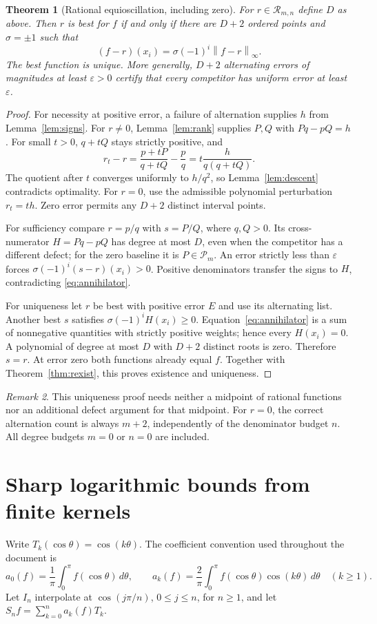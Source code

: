 \documentclass[11pt]{article}
\newcommand{\PP}{\mathcal P}
\newcommand{\norm}[1]{\left\lVert#1\right\rVert}
\newtheorem{theorem}{Theorem}[section]
\theoremstyle{remark}\newtheorem{remark}[theorem]{Remark}
\begin{document}
\begin{theorem}[Rational equioscillation, including zero]\label{thm:rational}
For $r\in\mathcal R_{m,n}$ define $D$ as above. Then $r$ is best for $f$
if and only if there are $D+2$ ordered points and $\sigma=\pm1$ such that
\[
 (f-r)(x_i)=\sigma(-1)^i\norm{f-r}_\infty.
\]
The best function is unique. More generally, $D+2$ alternating errors
of magnitudes at least $\varepsilon>0$ certify that every competitor has
uniform error at least $\varepsilon$.
\end{theorem}
\begin{proof}
For necessity at positive error, a failure of alternation supplies $h$
from Lemma~\ref{lem:signs}. For $r\ne0$, Lemma~\ref{lem:rank} supplies
$P,Q$ with $Pq-pQ=h$. For small $t>0$, $q+tQ$ stays strictly positive,
and
\[
 r_t-r=\frac{p+tP}{q+tQ}-\frac pq
       =t\frac{h}{q(q+tQ)}.
\]
The quotient after $t$ converges uniformly to $h/q^2$, so
Lemma~\ref{lem:descent} contradicts optimality. For $r=0$, use the
admissible polynomial perturbation $r_t=th$. Zero error permits any
$D+2$ distinct interval points.

For sufficiency compare $r=p/q$ with $s=P/Q$, where $q,Q>0$. Its
cross-numerator $H=Pq-pQ$ has degree at most $D$, even when the competitor
has a different defect; for the zero baseline it is $P\in\PP_m$.
An error strictly less than $\varepsilon$ forces
$\sigma(-1)^i(s-r)(x_i)>0$. Positive denominators transfer the signs to
$H$, contradicting \eqref{eq:annihilator}.

For uniqueness let $r$ be best with positive error $E$ and use its
alternating list. Another best $s$ satisfies
$\sigma(-1)^i H(x_i)\ge0$. Equation~\eqref{eq:annihilator} is a sum
of nonnegative quantities with strictly positive weights; hence every
$H(x_i)=0$. A polynomial of degree at most $D$ with $D+2$ distinct roots
is zero. Therefore $s=r$. At error zero both functions already equal $f$.
Together with Theorem~\ref{thm:rexist}, this proves existence and uniqueness.
\end{proof}

\begin{remark}
This uniqueness proof needs neither a midpoint of rational functions nor
an additional defect argument for that midpoint. For $r=0$, the correct
alternation count is always $m+2$, independently of the denominator budget
$n$. All degree budgets $m=0$ or $n=0$ are included.
\end{remark}

\section{Sharp logarithmic bounds from finite kernels}
\label{sec:kernels}
Write $T_k(\cos\theta)=\cos(k\theta)$. The coefficient convention used
throughout the document is
\begin{equation}\label{eq:coeff}
 a_0(f)=\frac1\pi\int_0^\pi f(\cos\theta)\,d\theta,\qquad
 a_k(f)=\frac2\pi\int_0^\pi f(\cos\theta)\cos(k\theta)\,d\theta\quad(k\ge1).
\end{equation}
Let $I_n$ interpolate at $\cos(j\pi/n)$, $0\le j\le n$, for $n\ge1$,
and let $S_nf=\sum_{k=0}^n a_k(f)T_k$.
\end{document}
